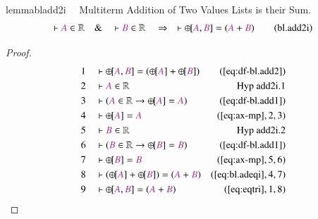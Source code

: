 \begin{restatable}{lemma}{bladd2i}~~ Multiterm Addition of Two Values Lists is
their Sum.
\begin{align}
\vdash \mc{A} \in \mathbb{R}\quad\&\quad \vdash \mc{B} \in
    \mathbb{R}\quad\Rightarrow\quad \vdash {\oplus\hspace{-1pt}[} \mc{A} ,
    \mc{B} ] = ( \mc{A} + \mc{B} )\label{eq:bl.add2i}\tag{bl.add2i}
\end{align}
\end{restatable}

\begin{proof}
\begin{align}
  1 &&  & \vdash {\oplus\hspace{-1pt}[} \mc{A} , \mc{B} ] = (
      {\oplus\hspace{-1pt}[} \mc{A} ] +
      {\oplus\hspace{-1pt}[} \mc{B} ]
      )&(\mbox{\ref{eq:df-bl.add2}})\notag
  \\ 2 &&  & \vdash \mc{A} \in \mathbb{R}&\text{Hyp~add2i.1}\notag%
  \\ 3 &&  & \vdash ( \mc{A} \in \mathbb{R} \rightarrow {\oplus\hspace{-1pt}[}
      \mc{A} ] = \mc{A}
      )&(\mbox{\ref{eq:df-bl.add1}})\notag
  \\ 4 &&  & \vdash {\oplus\hspace{-1pt}[} \mc{A} ] =
      \mc{A}&(\mbox{\ref{eq:ax-mp}},2,3)\notag
  \\ 5 &&  & \vdash \mc{B} \in \mathbb{R}&\text{Hyp~add2i.2}\notag%
  \\ 6 &&  & \vdash ( \mc{B} \in \mathbb{R} \rightarrow {\oplus\hspace{-1pt}[}
      \mc{B} ] = \mc{B}
      )&(\mbox{\ref{eq:df-bl.add1}})\notag
  \\ 7 &&  & \vdash {\oplus\hspace{-1pt}[} \mc{B} ] =
      \mc{B}&(\mbox{\ref{eq:ax-mp}},5,6)\notag
  \\ 8 &&  & \vdash ( {\oplus\hspace{-1pt}[} \mc{A} ] + {\oplus\hspace{-1pt}[}
      \mc{B} ] ) = ( \mc{A} + \mc{B}
      )&(\mbox{\ref{eq:bl.adeqi}},4,7)\notag
  \\ 9 &&  & \vdash {\oplus\hspace{-1pt}[} \mc{A} , \mc{B} ] = ( \mc{A} +
      \mc{B} )&(\mbox{\ref{eq:eqtri}},1,8)\notag
\end{align}
\end{proof}

